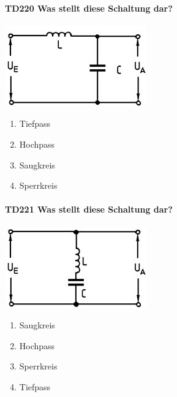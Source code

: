 \documentclass[8pt]{article}
\begin{document}
\begin{enumerate}
\begin{enumerate}[nolistsep,label=\Alph*]
{\paragraph*{TD220 Was stellt diese Schaltung dar?}
\begin{center}
	\begin{minipage}{\linewidth}
		\centering
		\includegraphics[scale=1.0]{pics/td220_a.jpg}
	\end{minipage}
\end{center}
\begin{enumerate}[nolistsep,label=\Alph*]
\item Tiefpass
\item Hochpass
\item Saugkreis
\item Sperrkreis
\end{enumerate}

\paragraph*{TD221 Was stellt diese Schaltung dar?}
\begin{center}
	\begin{minipage}{\linewidth}
		\centering
		\includegraphics[scale=1.0]{pics/td221_a.jpg}
	\end{minipage}
\end{center}
\begin{enumerate}[nolistsep,label=\Alph*]
\item Saugkreis
\item Hochpass
\item Sperrkreis
\item Tiefpass
\end{enumerate}

}
\end{enumerate}
\end{enumerate}
\end{document}
